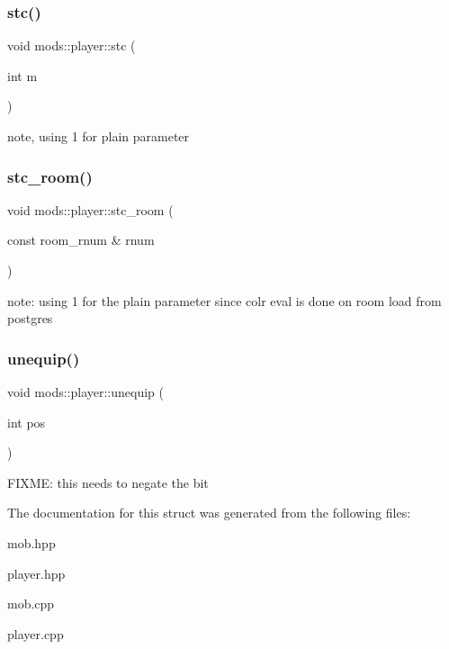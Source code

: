 \subsubsection{\texorpdfstring{stc()}{stc()}}
{\footnotesize\ttfamily void mods\+::player\+::stc (\begin{DoxyParamCaption}\item[{int}]{m }\end{DoxyParamCaption})}

note, using 1 for plain parameter \mbox{\label{classmods_1_1player_a05030c2c9439f95c84704ed6f7c993d1}} 
\subsubsection{\texorpdfstring{stc\+\_\+room()}{stc\_room()}}
{\footnotesize\ttfamily void mods\+::player\+::stc\+\_\+room (\begin{DoxyParamCaption}\item[{const room\+\_\+rnum \&}]{rnum }\end{DoxyParamCaption})}

note\+: using 1 for the plain parameter since colr eval is done on room load from postgres \mbox{\label{classmods_1_1player_a7fd5d35771a57dfe6c8ec7e1199873ab}} 
\subsubsection{\texorpdfstring{unequip()}{unequip()}}
{\footnotesize\ttfamily void mods\+::player\+::unequip (\begin{DoxyParamCaption}\item[{int}]{pos }\end{DoxyParamCaption})}

F\+I\+X\+ME\+: this needs to negate the bit 

The documentation for this struct was generated from the following files\+:\begin{DoxyCompactItemize}
\item 
mob.\+hpp\item 
player.\+hpp\item 
mob.\+cpp\item 
player.\+cpp\end{DoxyCompactItemize}
